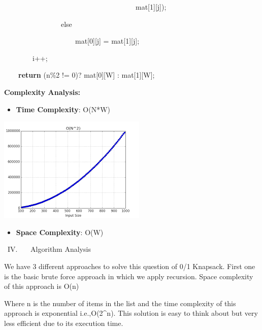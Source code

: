 \documentclass[letterpaper]{article}
\newcommand\liststyleWWNumv{%
\renewcommand\labelitemi{\ding{108}}
\renewcommand\labelitemii{{\BigCircle}}
\renewcommand\labelitemiii{\ding{110}}
\renewcommand\labelitemiv{\ding{108}}
}
\begin{document}
\begin{multicols}{2}
\begin{itemize}
{\color[rgb]{0.2509804,0.25882354,0.30588236}
\ \ \ \ \ \ \ \ \ \ \ \ \ \ \ \ \ \ \ \ \ \ \ \ \ \ \ \ \ \ \ \ \ \ \ \ \ mat[1][j]);}

{\color[rgb]{0.2509804,0.25882354,0.30588236}
\ \ \ \ \ \ \ \ \ \ \ \ \ \ \ \ else}

{\color[rgb]{0.2509804,0.25882354,0.30588236}
\ \ \ \ \ \ \ \ \ \ \ \ \ \ \ \ \ \ \ \ mat[0][j] = mat[1][j];}

{\color[rgb]{0.2509804,0.25882354,0.30588236}
\ \ \ \ \ \ \ \ i++;}


\bigskip

\textcolor[rgb]{0.2509804,0.25882354,0.30588236}{\ \ \ \ }\textbf{\textcolor[rgb]{0.2509804,0.25882354,0.30588236}{return}}\textcolor[rgb]{0.2509804,0.25882354,0.30588236}{
(n\%2 != 0)? mat[0][W] : mat[1][W];}


\bigskip
{\bfseries
Complexity Analysis:}


\bigskip

\liststyleWWNumv
\begin{itemize}
\item \textbf{Time Complexity}: O(N*W) 
\end{itemize}

\bigskip
\includegraphics[scale=1.0]{complexity}

\bigskip

\liststyleWWNumv
\begin{itemize}
\item \textbf{Space Complexity}: O(W) 
\end{itemize}

\bigskip
{\mdseries
\ IV. \ \ \ Algorithm Analysis}

We have 3 different approaches to solve this question of 0/1 Knapsack. First one is the basic brute force approach in
which we apply recursion. Space complexity of this approach is O(n)

Where n is the number of items in the list and the time complexity of this approach is exponential i.e.,O(2\^{}n). This
solution is easy to think about but very less efficient due to its execution time.



\end{itemize}
\end{multicols}
\end{document}
